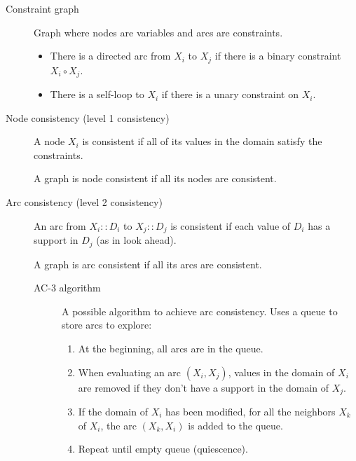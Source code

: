 \begin{description}
    \item[Constraint graph] 
        Graph where nodes are variables and arcs are constraints.
        \begin{itemize}
            \item There is a directed arc from $X_i$ to $X_j$ if there is a binary constraint $X_i \circ X_j$.
            \item There is a self-loop to $X_i$ if there is a unary constraint on $X_i$.
        \end{itemize}

    \item[Node consistency (level 1 consistency)] 
        A node $X_i$ is consistent if all of its values in the domain satisfy the constraints.

        A graph is node consistent if all its nodes are consistent.

    \item[Arc consistency (level 2 consistency)] 
        An arc from $X_i :: D_i$ to $X_j :: D_j$ is consistent if each value of $D_i$ has a support in $D_j$ (as in look ahead).

        A graph is arc consistent if all its arcs are consistent.

        \begin{description}
            \item[AC-3 algorithm] 
                A possible algorithm to achieve arc consistency.
                Uses a queue to store arcs to explore:
                \begin{enumerate}
                    \item At the beginning, all arcs are in the queue. 
                    \item When evaluating an arc $(X_i, X_j)$, 
                        values in the domain of $X_i$ are removed if they don't have a support in the domain of $X_j$.
                    \item If the domain of $X_i$ has been modified, 
                        for all the neighbors $X_k$ of $X_i$, the arc $(X_k, X_i)$ is added to the queue.
                    \item Repeat until empty queue (quiescence).
                \end{enumerate} 
            \end{description}


\end{description}

